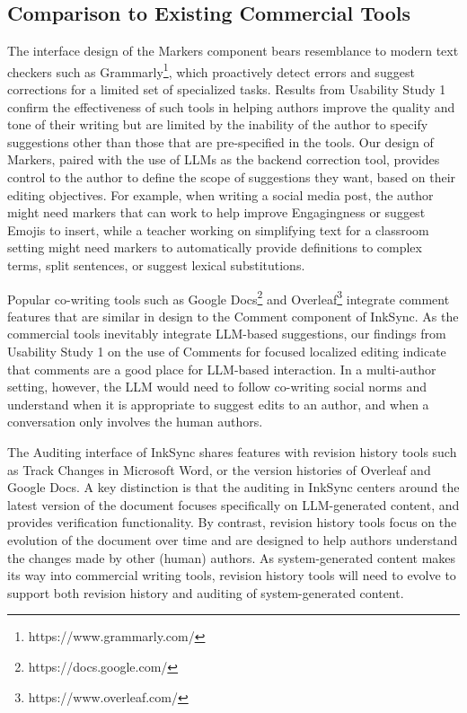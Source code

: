 \documentclass[manuscript]{acmart}
\begin{document}
\subsection{Comparison to Existing Commercial Tools}

The interface design of the Markers component bears resemblance to modern text checkers such as Grammarly\footnote{https://www.grammarly.com/}, which proactively detect errors and suggest corrections for a limited set of specialized tasks. Results from Usability Study 1 confirm the effectiveness of such tools in helping authors improve the quality and tone of their writing but are limited by the inability of the author to specify suggestions other than those that are pre-specified in the tools. Our design of Markers, paired with the use of LLMs as the backend correction tool, provides control to the author to define the scope of suggestions they want, based on their editing objectives. For example, when writing a social media post, the author might need markers that can work to help improve Engagingness or suggest Emojis to insert, while a teacher working on simplifying text for a classroom setting might need markers to automatically provide definitions to complex terms, split sentences, or suggest lexical substitutions.

Popular co-writing tools such as Google Docs\footnote{https://docs.google.com/} and Overleaf\footnote{https://www.overleaf.com/} integrate comment features that are similar in design to the Comment component of InkSync. As the commercial tools inevitably integrate LLM-based suggestions, our findings from Usability Study 1 on the use of Comments for focused localized editing indicate that comments are a good place for LLM-based interaction. In a multi-author setting, however, the LLM would need to follow co-writing social norms and understand when it is appropriate to suggest edits to an author, and when a conversation only involves the human authors.

The Auditing interface of InkSync shares features with revision history tools such as Track Changes in Microsoft Word, or the version histories of Overleaf and Google Docs. A key distinction is that the auditing in InkSync centers around the latest version of the document focuses specifically on LLM-generated content, and provides verification functionality.  
By contrast, revision history tools focus on the evolution of the document over time and are designed to help authors understand the changes made by other (human) authors. As system-generated content makes its way into commercial writing tools, revision history tools will need to evolve to support both revision history and auditing of system-generated content.
\end{document}
